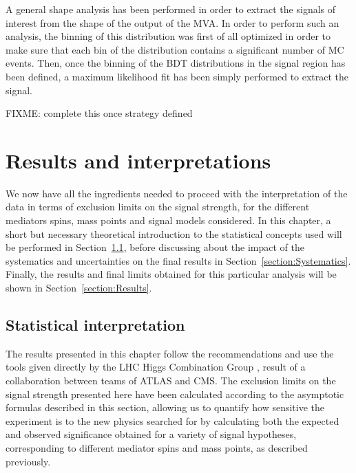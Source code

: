 \documentclass[a4paper, 10pt, openright]{report}
\begin{document}
A general shape analysis has been performed in order to extract the signals of interest from the shape of the output of the \ac{MVA}. In order to perform such an analysis, the binning of this distribution was first of all optimized in order to make sure that each bin of the distribution contains a significant number of \ac{MC} events. Then, once the binning of the \ac{BDT} distributions in the signal region has been defined, a maximum likelihood fit has been simply performed to extract the signal.

\color{red}FIXME: complete this once strategy defined \color{black}


















\chapter{Results and interpretations} \label{chapter:FinalResults}

We now have all the ingredients needed to proceed with the interpretation of the data in terms of exclusion limits on the signal strength, for the different mediators spins, mass points and signal models considered. In this chapter, a short but necessary theoretical introduction to the statistical concepts used will be performed in Section~\ref{section:Statistics}, before discussing about the impact of the systematics and uncertainties on the final results in Section~\ref{section:Systematics}. Finally, the results and final limits obtained for this particular analysis will be shown in Section~\ref{section:Results}.

\section{Statistical interpretation} \label{section:Statistics}

The results presented in this chapter follow the recommendations and use the tools given directly by the \ac{LHC} Higgs Combination Group \cite{combine}, result of a collaboration between teams of \ac{ATLAS} and \ac{CMS}. The exclusion limits on the signal strength presented here have been calculated according to the asymptotic formulas described in this section, allowing us to quantify how sensitive the experiment is to the new physics searched for by calculating both the expected and observed significance obtained for a variety of signal hypotheses, corresponding to different mediator spins and mass points, as described previously.
\end{document}
